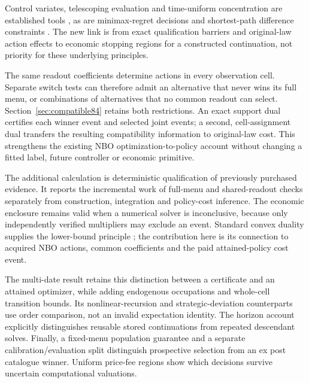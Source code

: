 \documentclass[ecta,nameyear,draft]{econsocart}
\begin{document}
Control variates, telescoping evaluation and time-uniform concentration are established tools \citep{munos2006variance,jiang2016,howard2020time,karampatziakis2021}, as are minimax-regret decisions and shortest-path difference constraints \citep{manski2004,floyd1962}. The new link is from exact qualification barriers and original-law action effects to economic stopping regions for a constructed continuation, not priority for these underlying principles.

The same readout coefficients determine actions in every observation cell. Separate switch tests can therefore admit an alternative that never wins its full menu, or combinations of alternatives that no common readout can select. Section~\ref{sec:compatible84} retains both restrictions. An exact support dual certifies each winner event and selected joint events; a second, cell-assignment dual transfers the resulting compatibility information to original-law cost. This strengthens the existing NBO optimization-to-policy account without changing a fitted label, future controller or economic primitive.

The additional calculation is deterministic qualification of previously purchased evidence. It reports the incremental work of full-menu and shared-readout checks separately from construction, integration and policy-cost inference. The economic enclosure remains valid when a numerical solver is inconclusive, because only independently verified multipliers may exclude an event. Standard convex duality supplies the lower-bound principle \citep{boyd2004}; the contribution here is its connection to acquired NBO actions, common coefficients and the paid attained-policy cost event.

The multi-date result retains this distinction between a certificate and an attained optimizer, while adding endogenous occupations and whole-cell transition bounds. Its nonlinear-recursion and strategic-deviation counterparts use order comparison, not an invalid expectation identity. The horizon account explicitly distinguishes reusable stored continuations from repeated descendant solves. Finally, a fixed-menu population guarantee and a separate calibration/evaluation split distinguish prospective selection from an ex post catalogue winner. Uniform price-fee regions show which decisions survive uncertain computational valuations.
\end{document}
